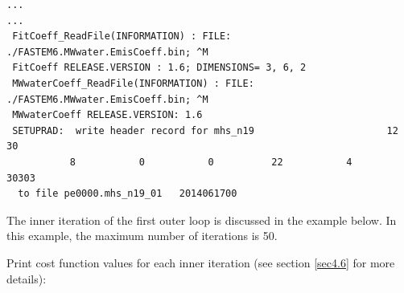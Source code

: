 \begin{scriptsize}
\begin{verbatim}
...
...
 FitCoeff_ReadFile(INFORMATION) : FILE: ./FASTEM6.MWwater.EmisCoeff.bin; ^M
 FitCoeff RELEASE.VERSION : 1.6; DIMENSIONS= 3, 6, 2
 MWwaterCoeff_ReadFile(INFORMATION) : FILE: ./FASTEM6.MWwater.EmisCoeff.bin; ^M
 MWwaterCoeff RELEASE.VERSION: 1.6
 SETUPRAD:  write header record for mhs_n19                       12          30
           8           0           0          22           4       30303
  to file pe0000.mhs_n19_01   2014061700
\end{verbatim}
\end{scriptsize}
The inner iteration of the first outer loop is discussed in the example below. In this example, the maximum number of iterations is 50.

Print cost function values for each inner iteration (see section \ref{sec4.6} for more details): 

